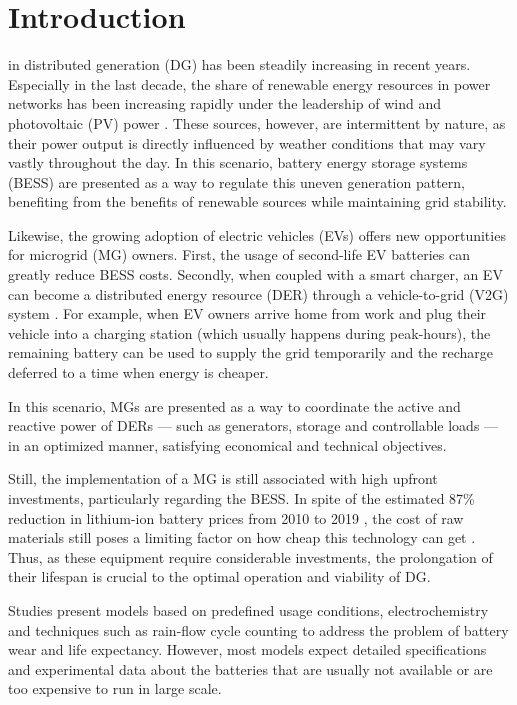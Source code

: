 \documentclass{ieeeaccess}
\begin{document}
\section{Introduction}
\label{sec:introduction}
     in distributed generation (DG) has been steadily increasing in recent years. Especially in the last decade, the share of renewable energy resources in power networks has been increasing rapidly under the leadership of wind and photovoltaic (PV) power \cite{KOCER2019}. These sources, however, are intermittent by nature, as their power output is directly influenced by weather conditions that may vary vastly throughout the day. In this scenario, battery energy storage systems (BESS) are presented as a way to regulate this uneven generation pattern, benefiting from the benefits of renewable sources while maintaining grid stability.


    Likewise, the growing adoption of electric vehicles (EVs) offers new opportunities for microgrid (MG) owners. First, the usage of second-life EV batteries can greatly reduce BESS costs. Secondly, when coupled with a smart charger, an EV can become a distributed energy resource (DER) through a vehicle-to-grid (V2G) system \cite{KEELI2012}. For example, when EV owners arrive home from work and plug their vehicle into a charging station (which usually happens during peak-hours), the remaining battery can be used to supply the grid temporarily and the recharge deferred to a time when energy is cheaper.

    In this scenario, MGs are presented as a way to coordinate the active and reactive power of DERs --- such as generators, storage and controllable loads --- in an optimized manner, satisfying economical and technical objectives.

    Still, the implementation of a MG is still associated with high upfront investments, particularly regarding the BESS. In spite of the estimated 87\% reduction in lithium-ion battery prices from 2010 to 2019 \cite{BBERG2019}, the cost of raw materials still poses a limiting factor on how cheap this technology can get \cite{HSIEH2019}. Thus, as these equipment require considerable investments, the prolongation of their lifespan is crucial to the optimal operation and viability of DG.

    Studies \cite{ECKER2014,NARAYAN2018,DIMEASHATZIARGYRIOU2005,MARYAMA2013} present models based on predefined usage conditions, electrochemistry and techniques such as rain-flow cycle counting to address the problem of battery wear and life expectancy. However, most models expect detailed specifications and experimental data about the batteries that are usually not available or are too expensive to run in large scale.
\end{document}

